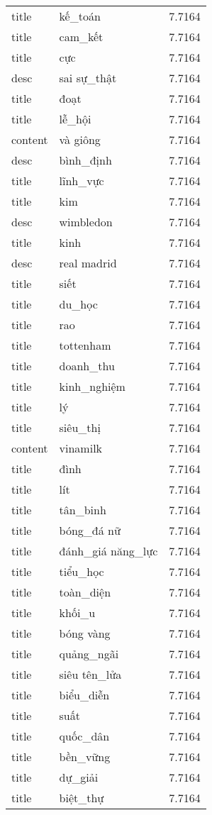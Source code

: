 \documentclass{article}
\begin{document}
\begin{tabular}{lll}
title & kế\_toán & 7.7164\\
title & cam\_kết & 7.7164\\
title & cực & 7.7164\\
desc & sai sự\_thật & 7.7164\\
title & đoạt & 7.7164\\
title & lễ\_hội & 7.7164\\
content & và giông & 7.7164\\
desc & bình\_định & 7.7164\\
title & lĩnh\_vực & 7.7164\\
title & kim & 7.7164\\
desc & wimbledon & 7.7164\\
title & kinh & 7.7164\\
desc & real madrid & 7.7164\\
title & siết & 7.7164\\
title & du\_học & 7.7164\\
title & rao & 7.7164\\
title & tottenham & 7.7164\\
title & doanh\_thu & 7.7164\\
title & kinh\_nghiệm & 7.7164\\
title & lý & 7.7164\\
title & siêu\_thị & 7.7164\\
content & vinamilk & 7.7164\\
title & đình & 7.7164\\
title & lít & 7.7164\\
title & tân\_binh & 7.7164\\
title & bóng\_đá nữ & 7.7164\\
title & đánh\_giá năng\_lực & 7.7164\\
title & tiểu\_học & 7.7164\\
title & toàn\_diện & 7.7164\\
title & khối\_u & 7.7164\\
title & bóng vàng & 7.7164\\
title & quảng\_ngãi & 7.7164\\
title & siêu tên\_lửa & 7.7164\\
title & biểu\_diễn & 7.7164\\
title & suất & 7.7164\\
title & quốc\_dân & 7.7164\\
title & bền\_vững & 7.7164\\
title & dự\_giải & 7.7164\\
title & biệt\_thự & 7.7164\\

\end{tabular}
\end{document}
